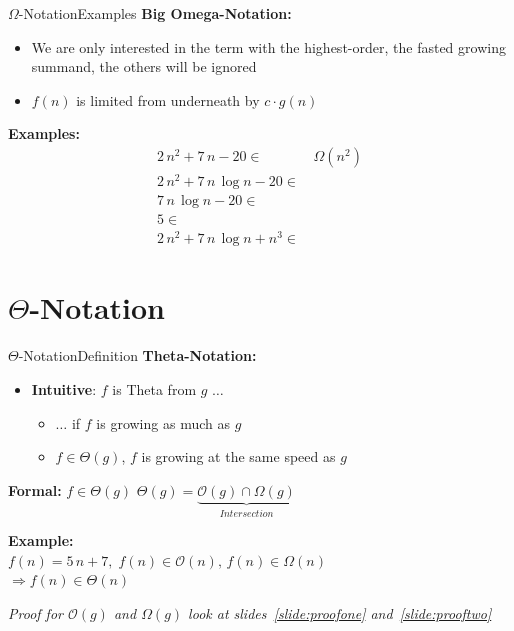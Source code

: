 \begin{frame}{$\Omega$-Notation}{Examples}
  \textbf{Big Omega-Notation:}
  \begin{itemize}
    \item
      We are only interested in the term with the highest-order,
      the fasted growing summand, the others will be ignored
    \item
      $f(n)$ is limited {\color{Mittel-Blau}from underneath} by
      $c \cdot g(n)$
  \end{itemize}
  \textbf{Examples:}
  \begin{align*}
    2 \, n^2 + 7 \, n - 20 \in & \,\Omega(n^2)\\
    2 \, n^2 + 7 \, n \, \log n - 20 \in & {}\\
    7 \, n \, \log n - 20 \in & {}\\
    5 \in & {}\\
    2 \, n^2 + 7 \, n \, \log n + n^3 \in & {}
  \end{align*}
\end{frame}


\section{\texorpdfstring{$\Theta$}{Theta}-Notation}

\begin{frame}{$\Theta$-Notation}{Definition}
  \textbf{Theta-Notation:}
  \begin{itemize}
    \item
      \textbf{Intuitive}: $f$ is Theta from $g$ $\ldots$
      \begin{itemize}
        \item
          $\ldots$ if $f$ is growing as much as $g$
        \item
          $f \in \Theta(g)$, $f$ is growing at the same speed as $g$
       \end{itemize}
  \end{itemize}
  \begin{block}{\textbf{Formal:} $f \in \Theta(g)$}
    $\Theta(g) = \underbrace{\mathcal O(g) \cap \Omega(g)}_{Intersection}$
  \end{block}
  \textbf{Example:}\\
  \hspace*{1.5em}$f(n) = 5 \, n + 7, \;
    f(n) \in \mathcal{O}(n), \,
    f(n) \in \Omega(n)$\\
  \hspace*{3.0em}$\Rightarrow f(n) \in \Theta(n)$\\[0.5em]
  \begin{center}
   \textit{Proof for $\mathcal{O}(g)$ and $\Omega(g)$ look at
     slides~\ref{slide:proofone} and~\ref{slide:prooftwo}}
  \end{center}
\end{frame}


